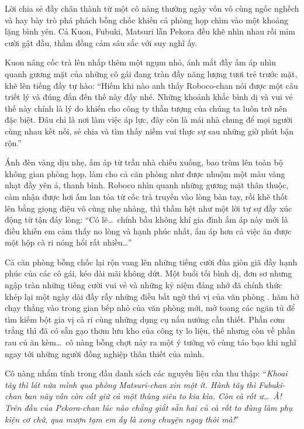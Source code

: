 \documentclass[../main.tex]{subfiles}
\begin{document}
Lời chia sẻ đầy chân thành từ một cô nàng thường ngày vốn vô cùng ngốc nghếch và hay bày trò phá phách bỗng chốc khiến cả phòng họp chìm vào một khoảng lặng bình yên. Cả Kuon, Fubuki, Matsuri lẫn Pekora đều khẽ nhìn nhau rồi mỉm cười gật đầu, thầm đồng cảm sâu sắc với suy nghĩ ấy.

Kuon nâng cốc trà lên nhấp thêm một ngụm nhỏ, ánh mắt đầy ấm áp nhìn quanh gương mặt của những cô gái đang tràn đầy năng lượng tươi trẻ trước mặt, khẽ lên tiếng đầy tự hào: ``Hiếm khi nào anh thấy Roboco-chan nói được một câu triết lý và đúng đắn đến thế này đấy nhé. Những khoảnh khắc bình dị và vui vẻ thế này chính là lý do khiến cho công ty thần tượng của chúng ta luôn trở nên đặc biệt. Đâu chỉ là nơi làm việc áp lực, đây còn là mái nhà chung để mọi người cùng nhau kết nối, sẻ chia và tìm thấy niềm vui thực sự sau những giờ phút bận rộn.''

Ánh đèn vàng dịu nhẹ, ấm áp từ trần nhà chiếu xuống, bao trùm lên toàn bộ không gian phòng họp, làm cho cả căn phòng như được nhuộm một màu vàng nhạt đầy yên ả, thanh bình. Roboco nhìn quanh những gương mặt thân thuộc, cảm nhận được hơi ấm lan tỏa từ cốc trà truyền vào lòng bàn tay, rồi khẽ thốt lên bằng giọng điệu vô cùng nhẹ nhàng, thì thầm hệt như một lời tự sự đầy xúc động từ tận đáy lòng: ``Có lẽ\dots\ chính bầu không khí gia đình ấm áp này mới là điều khiến em cảm thấy no lòng và hạnh phúc nhất, ấm áp hơn cả việc ăn được một hộp cà ri nóng hổi rất nhiều\dots''

Cả căn phòng bỗng chốc lại rộn vang lên những tiếng cười đùa giòn giã đầy hạnh phúc của các cô gái, kéo dài mãi không dứt. Một buổi tối bình dị, đơn sơ nhưng ngập tràn những tiếng cười vui vẻ và những kỷ niệm đáng nhớ đã chính thức khép lại một ngày dài đầy rẫy những điều bất ngờ thú vị của văn phòng \hll.
hăm hở chạy thẳng vào trong gian bếp nhỏ của văn phòng mới, mở toang các ngăn tủ để tìm kiếm bột gia vị cà ri cùng những dụng cụ nấu nướng cần thiết. Phần cơm trắng thì đã có sẵn gạo thơm lưu kho của công ty lo liệu, thế nhưng còn về phần rau củ ăn kèm\dots\ cô nàng bỗng chợt nảy ra một ý tưởng vô cùng táo bạo khi nghĩ ngay tới những người đồng nghiệp thân thiết của mình.

Cô nàng nhẩm tính trong đầu danh sách các nguyên liệu cần thu thập: ``\textit{Khoai tây thì lát nữa mình qua phòng Matsuri-chan xin một ít. Hành tây thì Fubuki-chan ban nãy vẫn còn cất giữ cả một thùng siêu to kia kìa. Còn cà rốt ư\dots\ À! Trên đầu của Pekora-chan lúc nào chẳng giắt sẵn hai củ cà rốt to đùng làm phụ kiện cơ chứ, qua mượn tạm em ấy là xong chuyện ngay thôi mà!}''
\end{document}
